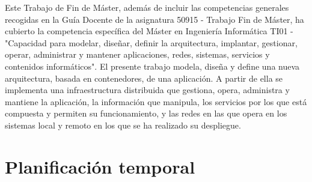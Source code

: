Este Trabajo de Fin de Máster, además de incluir las competencias generales recogidas en la Guía Docente de la asignatura 50915 - Trabajo Fin de Máster, ha cubierto la competencia específica del Máster en Ingeniería Informática TI01 - "Capacidad para modelar, diseñar, definir la arquitectura, implantar, gestionar, operar, administrar y mantener aplicaciones, redes, sistemas, servicios y contenidos informáticos". El presente trabajo modela, diseña y define una nueva arquitectura, basada en contenedores, de una aplicación. A partir de ella se implementa una infraestructura distribuida que gestiona, opera, administra y mantiene la aplicación, la información que manipula, los servicios por los que está compuesta y permiten su funcionamiento, y las redes en las que opera en los sistemas local y remoto en los que se ha realizado su despliegue.

\section{Planificación temporal}


